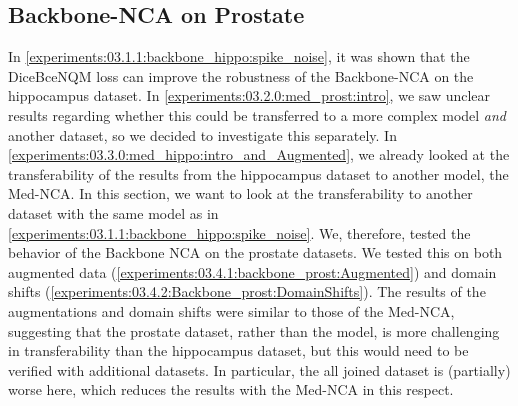 \subsection{Backbone-NCA on Prostate}
\label{experiments:03.4.0:backbone_prost:intro}
In \autoref{experiments:03.1.1:backbone_hippo:spike_noise}, it was shown that the DiceBceNQM loss can improve the robustness of the Backbone-NCA on the hippocampus dataset. In \autoref{experiments:03.2.0:med_prost:intro}, we saw unclear results regarding whether this could be transferred to a more complex model \textit{and} another dataset, so we decided to investigate this separately. In \autoref{experiments:03.3.0:med_hippo:intro_and_Augmented}, we already looked at the transferability of the results from the hippocampus dataset to another model, the Med-NCA. In this section, we want to look at the transferability to another dataset with the same model as in \autoref{experiments:03.1.1:backbone_hippo:spike_noise}. We, therefore, tested the behavior of the Backbone NCA on the prostate datasets. We tested this on both augmented data (\autoref{experiments:03.4.1:backbone_prost:Augmented}) and domain shifts (\autoref{experiments:03.4.2:Backbone_prost:DomainShifts}). 
The results of the augmentations and domain shifts were similar to those of the Med-NCA, suggesting that the prostate dataset, rather than the model, is more challenging in transferability than the hippocampus dataset, but this would need to be verified with additional datasets. In particular, the all joined dataset is (partially) worse here, which reduces the results with the Med-NCA in this respect.



